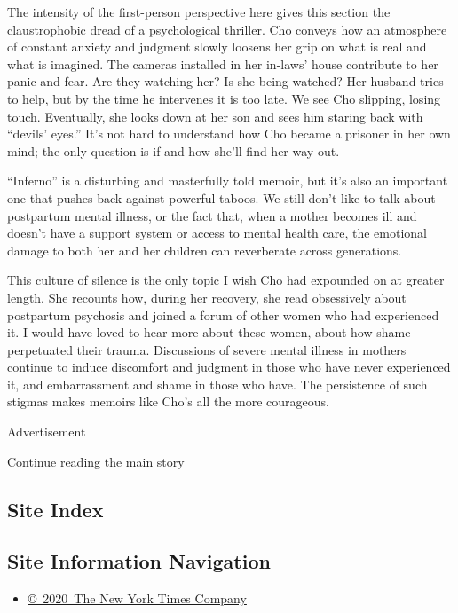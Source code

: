 The intensity of the first-person perspective here gives this section
the claustrophobic dread of a psychological thriller. Cho conveys how an
atmosphere of constant anxiety and judgment slowly loosens her grip on
what is real and what is imagined. The cameras installed in her in-laws'
house contribute to her panic and fear. Are they watching her? Is she
being watched? Her husband tries to help, but by the time he intervenes
it is too late. We see Cho slipping, losing touch. Eventually, she looks
down at her son and sees him staring back with ``devils' eyes.'' It's
not hard to understand how Cho became a prisoner in her own mind; the
only question is if and how she'll find her way out.

``Inferno'' is a disturbing and masterfully told memoir, but it's also
an important one that pushes back against powerful taboos. We still
don't like to talk about postpartum mental illness, or the fact that,
when a mother becomes ill and doesn't have a support system or access to
mental health care, the emotional damage to both her and her children
can reverberate across generations.

This culture of silence is the only topic I wish Cho had expounded on at
greater length. She recounts how, during her recovery, she read
obsessively about postpartum psychosis and joined a forum of other women
who had experienced it. I would have loved to hear more about these
women, about how shame perpetuated their trauma. Discussions of severe
mental illness in mothers continue to induce discomfort and judgment in
those who have never experienced it, and embarrassment and shame in
those who have. The persistence of such stigmas makes memoirs like Cho's
all the more courageous.

Advertisement

\protect\hyperlink{after-bottom}{Continue reading the main story}

\hypertarget{site-index}{%
\subsection{Site Index}\label{site-index}}

\hypertarget{site-information-navigation}{%
\subsection{Site Information
Navigation}\label{site-information-navigation}}

\begin{itemize}
\tightlist
\item
  \href{https://help.nytimes3xbfgragh.onion/hc/en-us/articles/115014792127-Copyright-notice}{©~2020~The
  New York Times Company}
\end{itemize}

